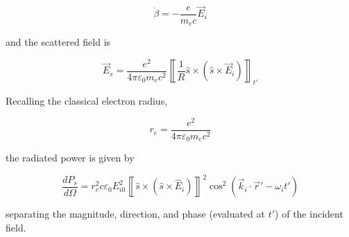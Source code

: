 \begin{equation}\label{eq:betadot_nonrel}
 \dot{\beta} = -\frac{e}{m_e c}\vec{E}_i
\end{equation}

\noindent and the scattered field is

\begin{equation}\label{eq:LW_nonrel}
 \vec{E}_s = \frac{e^2}{4\pi\varepsilon_0 m_e c^2} \left\llbracket \frac{1}{R} \hat{s} \times \left(\hat{s}\times\vec{E}_i\right)\right\rrbracket_{t'}
\end{equation}

\noindent Recalling the classical electron radius,

\begin{equation}\label{eq:re}
 r_e = \frac{e^2}{4\pi \varepsilon_0 m_e c^2}
\end{equation}

\noindent the radiated power is given by

\begin{equation}\label{dPdOmega2}
 \frac{dP_s}{d\Omega} = r_e^2 c \varepsilon_0 E_{i0}^2 \left\llbracket \hat{s} \times \left( \hat{s} \times \hat{E}_i \right) \right\rrbracket^2 \cos^2 \left( \vec{k}_i \cdot \vec{r}' - \omega_i t' \right)
\end{equation}

\noindent separating the magnitude, direction, and phase (evaluated at $t'$) of the incident field.

\begin{figure}[t]
 \pushtooutside
\end{figure}

